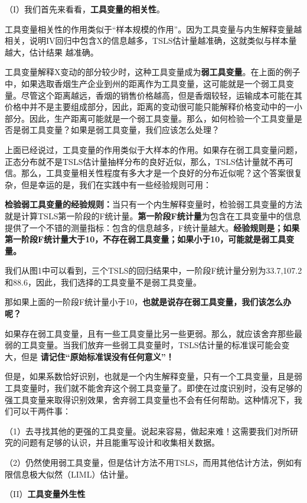 \documentclass[cn,12pt,math=newtx,citestyle=gb7714-2015,bibstyle=gb7714-2015]{elegantbook}
\begin{document}
	
	
	（I）我们首先来看看，\textbf{工具变量的相关性}。
	
	工具变量相关性的作用类似于“样本规模的作用”。因为工具变量与内生解释变量越相关，说明IV回归中包含X的信息越多，TSLS估计量越准确，这就类似与样本量越大，估计结果 越准确。
	
	工具变量解释X变动的部分较少时，这种工具变量成为\textbf{弱工具变量}。在上面的例子中，如果选取香烟生产企业到州的距离作为工具变量，这可能就是一个弱工具变量。尽管这个距离越远，香烟的销售价格越高，但是香烟较轻，运输成本可能在其价格中并不是主要组成部分，因此，距离的变动很可能只能解释价格变动中的一小部分。因此，生产距离可能就是一个弱工具变量。那么，如何检验一个工具变量是否是弱工具变量？如果是弱工具变量，我们应该怎么处理？
	
	上面已经说过，工具变量的作用类似于大样本的作用。如果存在弱工具变量问题，正态分布就不是TSLS估计量抽样分布的良好近似，那么，TSLS估计量就不再可信。那么，工具变量相关性程度有多大才是一个良好的分布近似呢？这个答案很复杂，但是幸运的是，我们在实践中有一些经验规则可用：
	
	\textbf{检验弱工具变量的经验规则：}当只有一个内生解释变量时，检验弱工具变量的方法就是计算TSLS第一阶段的F统计量。\textbf{第一阶段F统计量}为包含在工具变量中的信息提供了一个不错的测量指标：包含的信息越多，F统计量越大。\textbf{经验规则是；如果第一阶段F统计量大于10，不存在弱工具变量；如果小于10，可能就是弱工具变量。}
	
	我们从图1中可以看到，三个TSLS的回归结果中，一阶段F统计量分别为33.7,107.2和88.6，因此，我们选择的工具变量不是弱工具变量。
	
	那如果上面的一阶段F统计量小于10，\textbf{也就是说存在弱工具变量，我们该怎么办呢？}
	
	如果存在弱工具变量，且有一些工具变量比另一些更弱。那么，就应该舍弃那些最弱的工具变量。当我们放弃一些弱工具变量时，TSLS估计量的标准误可能会变大，但是       \textbf{请记住“原始标准误没有任何意义”！}
	
	但是，如果系数恰好识别，也就是一个内生解释变量，只有一个工具变量，且是弱工具变量时，我们就不能舍弃这个弱工具变量了。即使在过度识别时，没有足够的强工具变量来取得识别效果，舍弃弱工具变量也不会有任何帮助。这种情况下，我们可以干两件事：
	
	（1）去寻找其他的更强的工具变量。说起来容易，做起来难！这需要我们对所研究的问题有足够的认识，并且能重写设计和收集相关数据。
	
	（2）仍然使用弱工具变量，但是估计方法不用TSLS，而用其他估计方法，例如有限信息极大似然（LIML）估计量。
	
	（II）\textbf{工具变量外生性}
	
\end{document}
